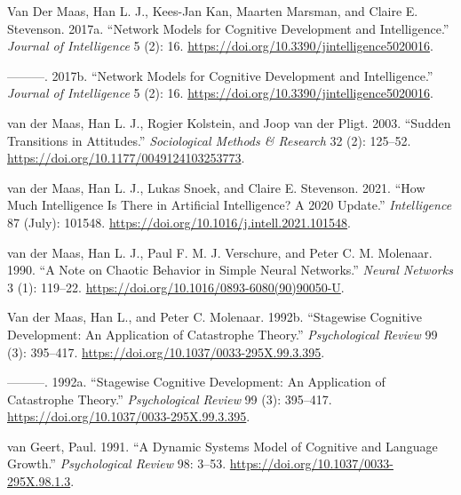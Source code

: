 \documentclass[
  a4paper,
  DIV=11,
  numbers=noendperiod,
  oneside]{scrreprt}
\newlength{\cslhangindent}
\newlength{\cslentryspacingunit} %
\newenvironment{CSLReferences}[2] %
 {%
  \setlength{\parindent}{0pt}
  \ifodd #1
  \let\oldpar\par
  \def\par{\hangindent=\cslhangindent\oldpar}
  \fi
  \setlength{\parskip}{#2\cslentryspacingunit}
 }%
 {}
\begin{document}
\begin{CSLReferences}{1}{0}
\leavevmode{}%
Van Der Maas, Han L. J., Kees-Jan Kan, Maarten Marsman, and Claire E.
Stevenson. 2017a. {``Network {Models} for {Cognitive Development} and
{Intelligence}.''} \emph{Journal of Intelligence} 5 (2): 16.
\url{https://doi.org/10.3390/jintelligence5020016}.

\leavevmode{}%
---------. 2017b. {``Network Models for Cognitive Development and
Intelligence.''} \emph{Journal of Intelligence} 5 (2): 16.
\url{https://doi.org/10.3390/jintelligence5020016}.

\leavevmode{}%
van der Maas, Han L. J., Rogier Kolstein, and Joop van der Pligt. 2003.
{``Sudden {Transitions} in {Attitudes}.''} \emph{Sociological Methods \&
Research} 32 (2): 125--52.
\url{https://doi.org/10.1177/0049124103253773}.

\leavevmode{}%
van der Maas, Han L. J., Lukas Snoek, and Claire E. Stevenson. 2021.
{``How Much Intelligence Is There in Artificial Intelligence? {A} 2020
Update.''} \emph{Intelligence} 87 (July): 101548.
\url{https://doi.org/10.1016/j.intell.2021.101548}.

\leavevmode{}%
van der Maas, Han L. J., Paul F. M. J. Verschure, and Peter C. M.
Molenaar. 1990. {``A Note on Chaotic Behavior in Simple Neural
Networks.''} \emph{Neural Networks} 3 (1): 119--22.
\url{https://doi.org/10.1016/0893-6080(90)90050-U}.

\leavevmode{}%
Van der Maas, Han L., and Peter C. Molenaar. 1992b. {``Stagewise
Cognitive Development: {An} Application of Catastrophe Theory.''}
\emph{Psychological Review} 99 (3): 395--417.
\url{https://doi.org/10.1037/0033-295X.99.3.395}.

\leavevmode{}%
---------. 1992a. {``Stagewise Cognitive Development: An Application of
Catastrophe Theory.''} \emph{Psychological Review} 99 (3): 395--417.
\url{https://doi.org/10.1037/0033-295X.99.3.395}.

\leavevmode{}%
van Geert, Paul. 1991. {``A Dynamic Systems Model of Cognitive and
Language Growth.''} \emph{Psychological Review} 98: 3--53.
\url{https://doi.org/10.1037/0033-295X.98.1.3}.


\end{CSLReferences}
\end{document}
